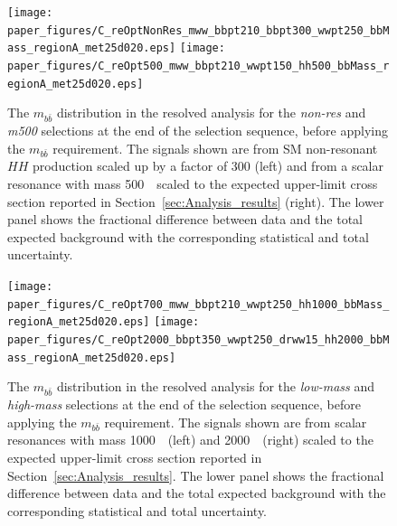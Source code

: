 \begin{figure}
\begin{flushleft}
\texttt{[image: paper\_figures/C\_reOptNonRes\_mww\_bbpt210\_bbpt300\_wwpt250\_bbMass\_regionA\_met25d020.eps]}
\texttt{[image: paper\_figures/C\_reOpt500\_mww\_bbpt210\_wwpt150\_hh500\_bbMass\_regionA\_met25d020.eps]}
\end{flushleft}
\caption[The $m_{b \bar{b}}$ distribution]{The $m_{b \bar{b}}$ distribution in the resolved analysis for the \emph{non-res} and \emph{m500} selections at the end of the
 selection sequence, before applying the $m_{b \bar{b}}$ requirement. The signals shown
 are from SM non-resonant $HH$ production scaled up by a factor of 300 (left) and from a scalar resonance with mass 500~\GeV\ scaled to the expected upper-limit
 cross section reported in Section~\ref{sec:Analysis_results} (right).  The lower panel shows the fractional difference
  between data and the total expected background
 with the corresponding statistical and total uncertainty.
} \label{fig:mbb_1}
\end{figure}
 
\begin{figure}
\begin{flushleft}
\texttt{[image: paper\_figures/C\_reOpt700\_mww\_bbpt210\_wwpt250\_hh1000\_bbMass\_regionA\_met25d020.eps]}
\texttt{[image: paper\_figures/C\_reOpt2000\_bbpt350\_wwpt250\_drww15\_hh2000\_bbMass\_regionA\_met25d020.eps]}
\end{flushleft}
\caption[The $m_{b \bar{b}}$ distribution]{The $m_{b \bar{b}}$ distribution in the resolved analysis for the
 \emph{low-mass} and \emph{high-mass} selections at the end of the
 selection sequence, before applying the $m_{b \bar{b}}$ requirement. The signals shown
 are from scalar resonances with mass 1000~\GeV\ (left) and 2000~\GeV\ (right)
 scaled to the expected upper-limit cross section reported in
 Section~\ref{sec:Analysis_results}.  The lower panel shows the fractional difference
  between data and the total expected background
 with the corresponding statistical and total uncertainty.} \label{fig:mbb_2}
\end{figure}
 
 
